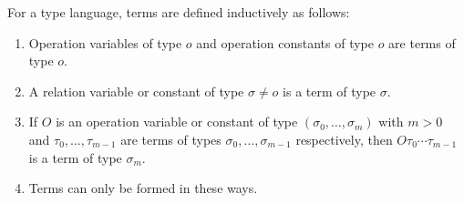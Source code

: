For a type language, terms are defined inductively as follows:

\begin{enumerate}
\item[(4)] Operation variables of type $o$ and operation constants of type $o$ are terms of type $o$.
\item[(5)] A relation variable or constant of type $\sigma \neq o$ is a term of type $\sigma$.
\item[(6)] If $O$ is an operation variable or constant of type $(\sigma_0, \ldots, \sigma_m)$ with $m > 0$ and $\tau_0, \ldots, \tau_{m-1}$ are terms of types $\sigma_0, \ldots, \sigma_{m-1}$ respectively, then $O\tau_0 \cdots \tau_{m-1}$ is a term of type $\sigma_m$.
\item[(7)] Terms can only be formed in these ways.
\end{enumerate}
